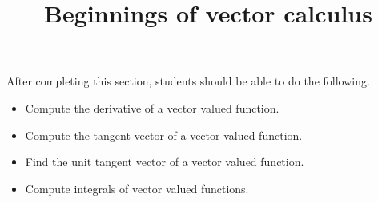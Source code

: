 \documentclass{ximera}
\title{Beginnings of vector calculus}
\begin{document}
\begin{abstract}
\end{abstract}

\maketitle

\begin{sectionOutcomes}

After completing this section, students should be able to do the following.

\begin{itemize}
\item Compute the derivative of a vector valued function. 
\item Compute the tangent vector of a vector valued function.
\item Find the unit tangent vector of a vector valued function.
\item Compute integrals of vector valued functions.
\end{itemize}

\end{sectionOutcomes}
\end{document}
